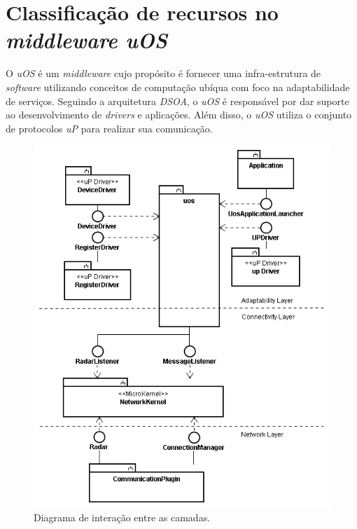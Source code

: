 \section{Classificação de recursos no \emph{middleware uOS}}
\label{sec:classificacaoNoUos}

O \emph{uOS} é um \emph{middleware} cujo propósito é fornecer uma infra-estrutura de \emph{software} utilizando conceitos de computação ubíqua com foco na adaptabilidade de serviços. Seguindo a arquitetura \emph{DSOA}, o \emph{uOS} é responsável por dar suporte ao desenvolvimento de \emph{drivers} e aplicações. Além disso, o \emph{uOS} utiliza o conjunto de protocolos \emph{uP} para realizar sua comunicação.

\begin{figure}[ht]
	\center
	\includegraphics[scale=0.6]{imagens/arquiteturaDoMiddlewareUOS}
	\caption{Diagrama de interação entre as camadas.}
	\label{fig:camadasUOS}
\end{figure}


